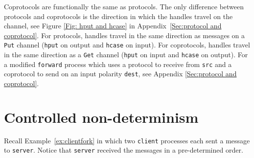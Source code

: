 \documentclass[11pt]{article}
\newcommand{\comment}[1]{\textcolor{blue}{#1}}
\begin{document}
Coprotocols are functionally the same as protocols. 
The only difference between protocols and coprotocols is the direction in which the handles travel on the channel, see Figure \ref{Fig: hput and hcase} in Appendix~\ref{Sec:protocol and coprotocol}.
For protocols, handles travel in the same direction as messages on a \lstinline$Put$ channel (\lstinline$hput$ on output and  \lstinline$hcase$ on input).
For coprotocols, handles travel in the same direction as a \lstinline$Get$ channel (\lstinline$hput$ on input and  \lstinline$hcase$ on output). 
For a modified  \lstinline$forward$ process which uses a protocol to receive from \lstinline$src$ and a coprotocol to send on an input polarity \lstinline$dest$, see Appendix \ref{Sec:protocol and coprotocol}.

\section{Controlled non-determinism}
\label{Sec:races}
Recall Example~\ref{ex:clientfork} in which two \lstinline$client$ processes each sent a message to \lstinline$server$. 
Notice that \lstinline$server$ received the messages in a pre-determined order.
\end{document}
